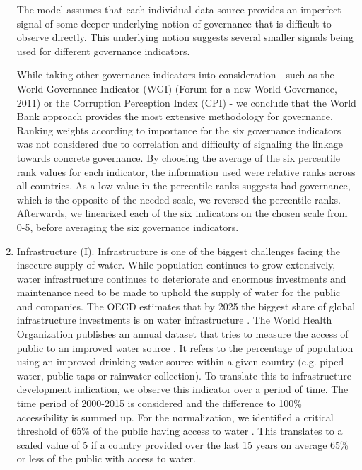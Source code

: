 \documentclass[a4paper]{article}
\begin{document}
\begin{enumerate}
The model assumes that each individual data source provides an imperfect signal of some deeper underlying notion of governance that is difficult to observe directly. 
This underlying notion suggests several smaller signals being used for different governance indicators.
 
While taking other governance indicators into consideration - such as the World Governance Indicator (WGI) (Forum for a new World Governance, 2011) or the Corruption Perception Index (CPI) - we conclude that the World Bank approach provides the most extensive methodology for governance. 
 Ranking weights according to importance for the six governance indicators was not considered due to correlation and difficulty of signaling the linkage towards concrete governance. 
 By choosing the average of the six percentile rank values for each indicator, the information used were relative ranks across all countries. 
 As a low value in the percentile ranks suggests bad governance, which is the opposite of the needed scale, we reversed the percentile ranks. 
 Afterwards, we linearized each of the six indicators on the chosen scale from 0-5, before averaging the six governance indicators. 
 	
 	\item Infrastructure (I).
Infrastructure is one of the biggest challenges facing the insecure supply of water. 
While population continues to grow extensively, water infrastructure continues to deteriorate and enormous investments and maintenance need to be made to uphold the supply of water for the public and companies. 
The OECD estimates that by 2025 the biggest share of global infrastructure investments is on water infrastructure \citep{OECD:2011}.
The World Health Organization publishes an annual dataset that tries to measure the access of public to an improved water source \citep{WHO:2016}.
It refers to the percentage of population using an improved drinking water source within a given country (e.g. piped water, public taps or rainwater collection). 
To translate this to infrastructure development indication, we observe this indicator over a period of time. 
The time period of 2000-2015 is considered and the difference to 100\% accessibility is summed up. 
For the normalization, we identified a critical threshold of 65\% of the public having access to water \citep{Diop:2002}.
This translates to a scaled value of 5 if a country provided over the last 15 years on average 65\% or less of the public with access to water.
\end{enumerate}
\end{document}
